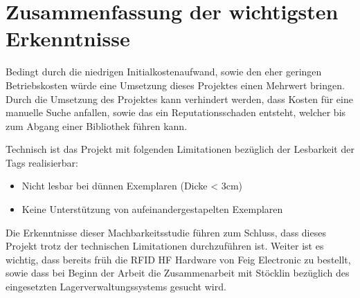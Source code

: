 \chapter{Zusammenfassung der wichtigsten Erkenntnisse}
Bedingt durch die niedrigen Initialkostenaufwand, sowie den eher geringen Betriebskosten würde eine Umsetzung dieses Projektes einen Mehrwert bringen.
Durch die Umsetzung des Projektes kann verhindert werden, dass Kosten für eine manuelle Suche anfallen, sowie das ein Reputationsschaden entsteht, welcher bis zum Abgang einer Bibliothek führen kann.

\vspace{2em}

\noindent

Technisch ist das Projekt mit folgenden Limitationen bezüglich der Lesbarkeit der Tags realisierbar:
\begin{itemize}
	\item Nicht lesbar bei dünnen Exemplaren (Dicke < 3cm)
	\item Keine Unterstützung von aufeinandergestapelten Exemplaren
\end{itemize}

\vspace{2em}

\noindent
Die Erkenntnisse dieser Machbarkeitsstudie führen zum Schluss, dass dieses Projekt trotz der technischen Limitationen durchzuführen ist.
Weiter ist es wichtig, dass bereits früh die RFID HF Hardware von Feig Electronic zu bestellt, sowie dass bei Beginn der Arbeit die Zusammenarbeit mit Stöcklin bezüglich des eingesetzten Lagerverwaltungssystems gesucht wird.
